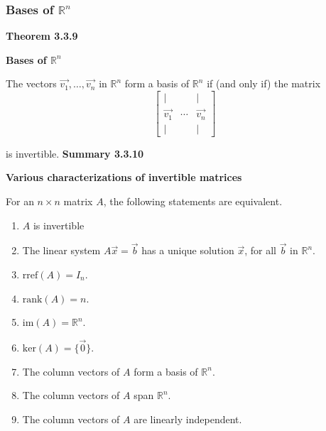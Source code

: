 \subsubsection*{Bases of $\mathbb{R}^{n}$}
\textbf{Theorem 3.3.9}\\
\par\noindent\textbf{Bases of $\mathbb{R}^{n}$}
\par\noindent The vectors $\vec{v_{1}},\ldots{},\vec{v_{n}}$ in $\mathbb{R}^{n}$ form a basis of $\mathbb{R}^{n}$ if (and only if) the matrix
\[\left[\begin{array}{ccc}|& &|\\ \vec{v_{1}}&\cdots{}&\vec{v_{n}}\\ |& &|\end{array}\right]\]
\par\noindent is invertible.
\textbf{Summary 3.3.10}\\
\par\noindent\textbf{Various characterizations of invertible matrices}
\par\noindent For an $n\times{}n$ matrix $A$, the following statements are equivalent.
\renewcommand{\labelenumi}{\textbf{\roman{enumi}.}}
\begin{enumerate}
\item $A$ is invertible
\item The linear system $A\vec{x}=\vec{b}$ has a unique solution $\vec{x}$, for all $\vec{b}$ in $\mathbb{R}^{n}$.
\item $\textrm{rref}(A)=I_{n}$.
\item $\textrm{rank}(A)=n$.
\item $\textrm{im}(A)=\mathbb{R}^{n}$.
\item $\textrm{ker}(A)=\{\vec{0}\}$.
\item The column vectors of $A$ form a basis of $\mathbb{R}^{n}$.
\item The column vectors of $A$ span $\mathbb{R}^{n}$.
\item The column vectors of $A$ are linearly independent.
\end{enumerate}
\pagebreak

